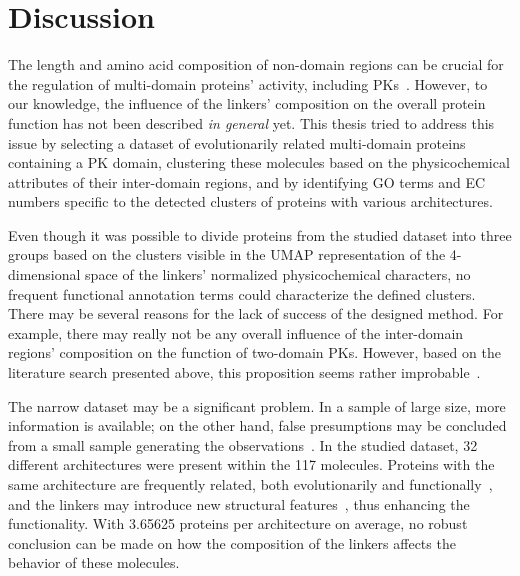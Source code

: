 \chapter{Discussion}
\label{discussion}

The length and amino acid composition of non-domain regions can be crucial for the
regulation of multi-domain proteins' activity, including
PKs~\cite{gogl2019disordered, vigil2004conformational}.
However, to our knowledge, the influence of the linkers' composition on the overall
protein function has not been described \emph{in general} yet.
This thesis tried to address this issue by selecting a dataset of evolutionarily related
multi-domain proteins containing a PK domain, clustering these molecules based on the
physicochemical attributes of their inter-domain regions, and by identifying GO terms and
EC numbers specific to the detected clusters of proteins with various architectures.

Even though it was possible to divide proteins from the studied dataset into three groups
based on the clusters visible in the UMAP representation of the 4-dimensional space of
the linkers' normalized physicochemical characters, no frequent functional annotation
terms could characterize the defined clusters.
There may be several reasons for the lack of success of the designed method.
For example, there may really not be any overall influence of the inter-domain regions'
composition on the function of two-domain PKs.
However, based on the literature search presented above, this proposition seems rather
improbable~\cite{winkler1977tomato, van1997linker, ikebe1998hinge, robinson1998optimizing,
rice1999structural, gokhale2000role, case2000role, pufall2002autoinhibitory,
khalil2008kinesin, hariharan2009insights, smock2010interdomain, liu2010molecular,
shastry2010neck, ma2011dynamic, cyrus2011impact, kalodimos2011nmr, pohane2015modulation,
klement2015effect, rozycki2017length, jakubec2018widespread, gogl2019disordered}.

The narrow dataset may be a significant problem.
In a sample of large size, more information is available; on the other hand, false
presumptions may be concluded from a small sample generating the
observations~\cite{tanaka1987big, hua2005optimal}.
In the studied dataset, 32 different architectures were present within the 117 molecules.
Proteins with the same architecture are frequently related, both evolutionarily and
functionally~\cite{vogel2004structure, hegyi2001annotation, bashton2002geometry}, and the
linkers may introduce new structural features~\cite{papaleo2016role}, thus enhancing the
functionality.
With 3.65625 proteins per architecture on average, no robust conclusion can be made on how
the composition of the linkers affects the behavior of these molecules.

